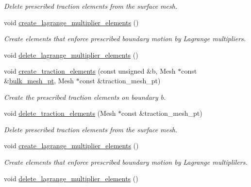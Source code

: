 \begin{DoxyCompactItemize}
\begin{DoxyCompactList}\small\item\em Delete prescribed traction elements from the surface mesh. \end{DoxyCompactList}\item 
void \hyperlink{classFSICollapsibleChannelProblem_a328465bc567702963e06c07f5550f80a}{create\+\_\+lagrange\+\_\+multiplier\+\_\+elements} ()
\begin{DoxyCompactList}\small\item\em Create elements that enforce prescribed boundary motion by Lagrange multipliers. \end{DoxyCompactList}\item 
void \hyperlink{classFSICollapsibleChannelProblem_ab853c978c8e94505cd36781569b1dbf1}{delete\+\_\+lagrange\+\_\+multiplier\+\_\+elements} ()
\item 
void \hyperlink{classFSICollapsibleChannelProblem_af7352e5fd5ea8965adbc9505749442a3}{create\+\_\+traction\+\_\+elements} (const unsigned \&b, Mesh $\ast$const \&\hyperlink{classFSICollapsibleChannelProblem_a5ea2780b4f97b65b5c122a952093e6c2}{bulk\+\_\+mesh\+\_\+pt}, Mesh $\ast$const \&traction\+\_\+mesh\+\_\+pt)
\begin{DoxyCompactList}\small\item\em Create the prescribed traction elements on boundary b. \end{DoxyCompactList}\item 
void \hyperlink{classFSICollapsibleChannelProblem_af1848415423aa824b91357922905a18f}{delete\+\_\+traction\+\_\+elements} (Mesh $\ast$const \&traction\+\_\+mesh\+\_\+pt)
\begin{DoxyCompactList}\small\item\em Delete prescribed traction elements from the surface mesh. \end{DoxyCompactList}\item 
void \hyperlink{classFSICollapsibleChannelProblem_a328465bc567702963e06c07f5550f80a}{create\+\_\+lagrange\+\_\+multiplier\+\_\+elements} ()
\begin{DoxyCompactList}\small\item\em Create elements that enforce prescribed boundary motion by Lagrange multiplilers. \end{DoxyCompactList}\item 
void \hyperlink{classFSICollapsibleChannelProblem_ab853c978c8e94505cd36781569b1dbf1}{delete\+\_\+lagrange\+\_\+multiplier\+\_\+elements} ()
\end{DoxyCompactItemize}
